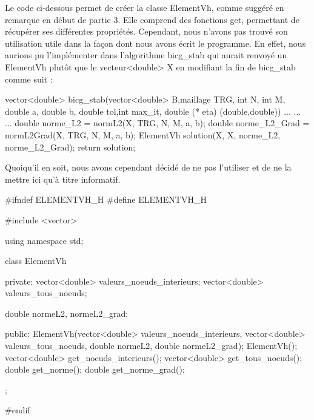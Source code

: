 \label{sec:vh}
Le code ci-dessous permet de créer la classe ElementVh, comme suggéré en remarque en début de partie 3. Elle comprend des fonctions get, permettant de récupérer ses différentes propriétés. Cependant, nous n'avons pas trouvé son utilisation utile dans la façon dont nous avons écrit le programme. En effet, nous aurions pu l'implémenter dans l'algorithme bicg\_stab qui aurait renvoyé un ElementVh plutôt que le vecteur<double> X en modifiant la fin de bicg\_stab comme suit :
\vspace{0.8em}

\begin{codeblock}
vector<double> bicg_stab(vector<double> B,maillage TRG, int N, int M, double a,
    double b, double tol,int max_it, double (* eta) (double,double)){
    ...
    ...
    ...
    double norme_L2 = normL2(X, TRG, N, M, a, b);
    double norme_L2_Grad = normL2Grad(X, TRG, N, M, a, b);
    ElementVh solution(X, X, norme_L2, norme_L2_Grad);
return solution;
}
\end{codeblock}

Quoiqu'il en soit, nous avons cependant décidé de ne pas l'utiliser et de ne la mettre ici qu'à titre informatif.

\newpage

\begin{codeblock}
#ifndef ELEMENTVH_H
#define ELEMENTVH_H

#include <vector>

using namespace std;

class ElementVh {

private:
    vector<double> valeurs_noeuds_interieurs;
    vector<double> valeurs_tous_noeuds;

    double normeL2, normeL2_grad;

public:
    ElementVh(vector<double> valeurs_noeuds_interieurs, vector<double> valeurs_tous_noeuds,
        double normeL2, double normeL2_grad);
    ElementVh();
    vector<double> get_noeuds_interieurs();
    vector<double> get_tous_noeuds();
    double get_norme();
    double get_norme_grad();
};

#endif
\end{codeblock}

